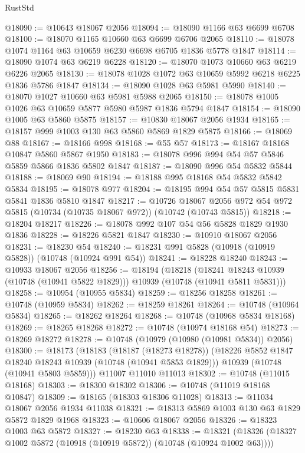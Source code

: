 \begin{lexlean}{RustStd}
\begin{coremodule}
@18090 := @10643 @18067 @2056
@18094 := @18090 @1166 @63 @6699 @6708
@18100 := @18070 @1165 @10660 @63 @6699 @6706 @2065
@18110 := @18078 @1074 @1164 @63 @10659 @6230 @6698 @6705 @1836 @5778 @1847
@18114 := @18090 @1074 @63 @6219 @6228
@18120 := @18070 @1073 @10660 @63 @6219 @6226 @2065
@18130 := @18078 @1028 @1072 @63 @10659 @5992 @6218 @6225 @1836 @5786 @1847
@18134 := @18090 @1028 @63 @5981 @5990
@18140 := @18070 @1027 @10660 @63 @5981 @5988 @2065
@18150 := @18078 @1005 @1026 @63 @10659 @5877 @5980 @5987 @1836 @5794 @1847
@18154 := @18090 @1005 @63 @5860 @5875
@18157 := @10830 @18067 @2056 @1934
@18165 := @18157 @999 @1003 @130 @63 @5860 @5869 @1829 @5875
@18166 := @18069 @88
@18167 := @18166 @998
@18168 := @55 @57
@18173 := @18167 @18168 @10847 @5860 @5867 @1950
@18183 := @18078 @996 @994 @54 @57 @5846 @5859 @5866 @1836 @5802 @1847
@18187 := @18090 @996 @54 @5832 @5844
@18188 := @18069 @90
@18194 := @18188 @995 @18168 @54 @5832 @5842 @5834
@18195 := @18078 @977
@18204 := @18195 @994 @54 @57 @5815 @5831 @5841 @1836 @5810 @1847
@18217 := @10726
    @18067
    @2056
    @972
    @54
    @972
    @5815
    (@10734 (@10735 @18067 @972))
    (@10742 (@10743 @5815))
@18218 := @18204 @18217
@18226 := @18078 @992 @107 @54 @56 @5828 @1829 @1930 @1836
@18228 := @18226 @5821 @1847
@18230 := @10910 @18067 @2056
@18231 := @18230 @54
@18240 := @18231 @991 @5828 (@10918 (@10919 @5828)) (@10748 (@10924 @991 @54))
@18241 := @18228 @18240
@18243 := @10933 @18067 @2056
@18256 := @18194
    (@18218
      (@18241 @18243 @10939 (@10748 (@10941 @5822 @1829)))
      @10939
      (@10748 (@10941 @5811 @5831)))
@18258 := @10954 (@10955 @5834)
@18259 := @18256 @18258
@18261 := @10748 (@10959 @5834)
@18262 := @18259 @18261
@18264 := @10748 (@10964 @5834)
@18265 := @18262 @18264
@18268 := @10748 (@10968 @5834 @18168)
@18269 := @18265 @18268
@18272 := @10748 (@10974 @18168 @54)
@18273 := @18269 @18272
@18278 := @10748 (@10979 (@10980 (@10981 @5834)) @2056)
@18300 := @18173
    (@18183
      (@18187 (@18273 @18278))
      (@18226 @5852 @1847 @18240 @18243 @10939 (@10748 (@10941 @5853 @1829)))
      @10939
      (@10748 (@10941 @5803 @5859)))
    @11007
    @11010
    @11013
@18302 := @10748 (@11015 @18168)
@18303 := @18300 @18302
@18306 := @10748 (@11019 @18168 @10847)
@18309 := @18165 (@18303 @18306 @11028)
@18313 := @11034 @18067 @2056 @1934 @11038
@18321 := @18313 @5869 @1003 @130 @63 @1829 @5872 @1829 @1968
@18323 := @10606 @18067 @2056
@18326 := @18323 @1003 @63 @5872
@18327 := @18230 @63
@18338 := @18321 (@18326 (@18327 @1002 @5872 (@10918 (@10919 @5872)) (@10748 (@10924 @1002 @63))))

\end{coremodule}
\end{lexlean}
